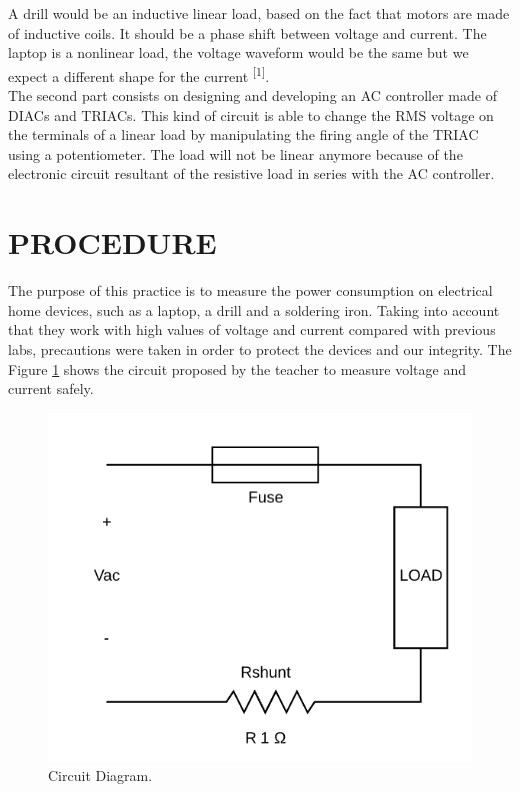 \documentclass[journal]{IEEEtran}
\begin{document}
A drill would be an inductive linear load, based on the fact that 
motors are made of inductive coils. It should be a phase shift between 
voltage and current. The laptop is a nonlinear load, the voltage 
waveform would be the same but we expect a different shape for the 
current \textsuperscript{[1]}. \\

The second part consists on designing and developing an AC controller 
made of DIACs and TRIACs. This kind of circuit is able to change the 
RMS voltage on the terminals of a linear load by manipulating the 
firing angle of the TRIAC using a potentiometer. The load will not be 
linear anymore because of the electronic circuit resultant of the 
resistive load in series with the AC controller.\\


\section{PROCEDURE}

The purpose of this practice is to measure the power consumption on 
electrical home devices, such as a laptop, a drill and a soldering 
iron. Taking into account that they work with high values of voltage 
and current compared with previous labs, precautions were taken in 
order to protect the devices and our integrity. The Figure
\ref{circuit_diagram} 
shows the circuit proposed by the teacher to measure voltage and 
current safely. 

\begin{figure}[h]
\centering
\includegraphics[clip,width=0.8\columnwidth]{circuit_diagram.png}
\caption{Circuit Diagram.}
\label{circuit_diagram}
\end{figure}
\end{document}
